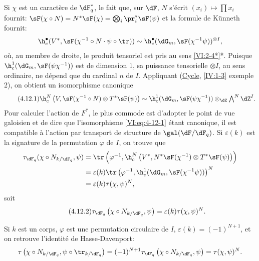 Si $\chi$ est un caractère de $\dF_q^\ast$, le fait que, sur $\dF$, $N$ 
s'écrit $(x_i)\mapsto \prod x_i$ fournit: 
$\sF(\chi\circ N)=N^\ast\sF(\chi) = \bigotimes_i \pr_i^\ast\sF(\psi)$ 
et la formule de K\"unneth fournit: 
\[
  \h_c^\bullet(V^\ast,\sF(\chi^{-1}\circ N\cdot \psi\circ \tr)) \sim \h_c^\bullet(\dG_m,\sF(\chi^{-1}\psi))^{\otimes I} \text{,} 
\]
où, au membre de droite, le produit tensoriel est pris au sens 
\ref{VI:2-4*}*. Puisque $\h_c^1(\dG_m,\sF(\psi\chi^{-1}))$ est de dimension 
$1$, sa puissance tensorielle $\otimes I$, au sens ordinaire, ne dépend que 
du cardinal $n$ de $I$. Appliquant (\hyperref[IV]{Cycle}, \ref{IV:1-3} exemple 
2), on obtient un isomorphisme canonique 
\begin{equation*}\tag{4.12.1}\label{VI:eq:4-12-1}
  \h_c^N\left(V,\sF(\chi^{-1}\circ N)\otimes T^\ast \sF(\psi)\right) \sim \h_c^1(\dG_m,\sF(\psi\chi^{-1})) \otimes_\dZ \textstyle \bigwedge^N \dZ^I \text{.}
\end{equation*}
Pour calculer l'action de $F^\ast$, le plus commode est d'adopter le point de 
vue galoisien et de dire que l'isomorphisme \eqref{VI:eq:4-12-1} étant 
canonique, il est compatible à l'action par transport de structure de 
$\gal(\dF/\dF_q)$. Si $\varepsilon(k)$ est la signature de la permutation 
$\varphi$ de $I$, on trouve que 
\begin{align*} 
  \tau_{\dF_q}(\chi\circ N_{k/\dF_q},\psi) 
    &= \tr\left(\varphi^{-1},\h_c^N\left(V^\ast,N^\ast\sF(\chi^{-1})\otimes T^\ast \sF(\psi)\right)\right) \\ 
    &= \varepsilon(k) \tr\left(\varphi^{-1},\h_c^1(\dG_m,\sF(\chi^{-1}\psi))\right)^N \\
    &= \varepsilon(k) \tau(\chi,\psi)^N \text{,} 
\end{align*}
soit 
\begin{equation*}\tag{4.12.2}\label{VI:eq:4-12-2}
  \tau_{\dF_q}\left(\chi\circ N_{k/\dF_q},\psi\right) = \varepsilon(k) \tau(\chi,\psi)^N \text{.} 
\end{equation*}

Si $k$ est un corps, $\varphi$ est une permutation circulaire de $I$, 
$\varepsilon(k) = (-1)^{N+1}$, et on retrouve l'identité de Hasse-Davenport: 
\[
  \tau\left(\chi\circ N_{k/\dF_q},\psi\circ \tr_{k/\dF_q}\right) = (-1)^{N+1} \tau_{\dF_q}\left(\chi\circ N_{k/\dF_q},\psi\right) = \tau(\chi,\psi)^N \text{.} 
\]





